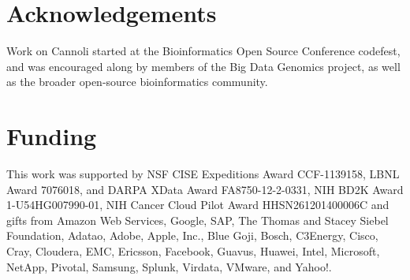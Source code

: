 \documentclass{bioinfo}
\begin{document}
\section*{Acknowledgements}

Work on Cannoli started at the Bioinformatics Open Source Conference
codefest, and was encouraged along by members of the Big Data Genomics
project, as well as the broader open-source bioinformatics community.

\section*{Funding}

This work was supported by NSF CISE Expeditions Award CCF-1139158, LBNL Award 7076018, and DARPA XData Award FA8750-12-2-0331, NIH BD2K Award 1-U54HG007990-01, NIH Cancer Cloud Pilot Award HHSN261201400006C and gifts from Amazon Web Services, Google, SAP,  The Thomas and Stacey Siebel Foundation, Adatao, Adobe, Apple, Inc., Blue Goji, Bosch, C3Energy, Cisco, Cray, Cloudera, EMC, Ericsson, Facebook, Guavus, Huawei, Intel, Microsoft, NetApp, Pivotal, Samsung, Splunk, Virdata, VMware, and Yahoo!.

%
%
%
%
%
%
%
%
%




\end{document}
